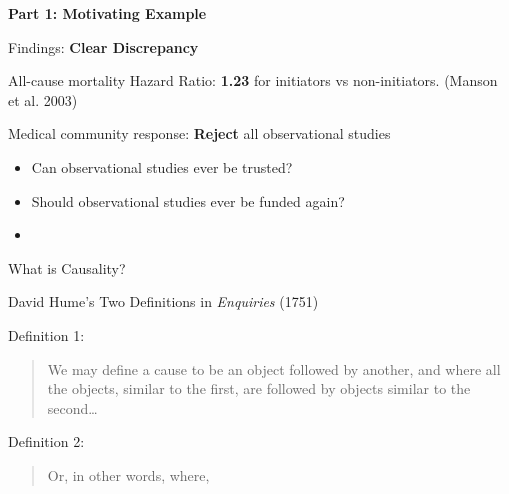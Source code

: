 \documentclass[
  ignorenonframetext,
  aspectratio=169,
]{beamer}
\begin{document}
\begin{frame}{\textbf{Part 1: Motivating Example}}
\begin{block}{Findings: \textbf{Clear Discrepancy}}
\label{findings-clear-discrepancy}
\begin{tcolorbox}[enhanced jigsaw, toprule=.15mm, leftrule=.75mm, bottomtitle=1mm, colbacktitle=quarto-callout-warning-color!10!white, rightrule=.15mm, bottomrule=.15mm, left=2mm, breakable, coltitle=black, arc=.35mm, toptitle=1mm, title={Experimental Findings: \textbf{opposite of observational findings}}, colback=white, opacityback=0, titlerule=0mm, opacitybacktitle=0.6, colframe=quarto-callout-warning-color-frame]

All-cause mortality Hazard Ratio: \textbf{1.23} for initiators vs
non-initiators. (Manson et al. 2003)

\end{tcolorbox}
\end{block}

\begin{block}{Medical community response: \textbf{Reject} all
observational studies}
\label{medical-community-response-reject-all-observational-studies}
\begin{itemize}
\item
  Can observational studies ever be trusted?
\item
  Should observational studies ever be funded again?
\item
  \color{cyan}{What went wrong?}
\end{itemize}
\end{block}

\begin{block}{What is Causality?}
\label{what-is-causality}
\end{block}

\begin{block}{David Hume's Two Definitions in \emph{Enquiries} (1751)}
\label{david-humes-two-definitions-in-enquiries-1751}
\begin{block}{Definition 1:}
\label{definition-1}
\begin{quote}
We may define a cause to be an object followed by another, and where all
the objects, similar to the first, are followed by objects similar to
the second\ldots{}
\end{quote}
\end{block}

\begin{block}{Definition 2:}
\label{definition-2}
\begin{quote}
Or, in other words, where,
\color{cyan}{if the first object had not been, the second never would have existed}
\end{quote}


\end{block}
\end{block}
\end{frame}
\end{document}
